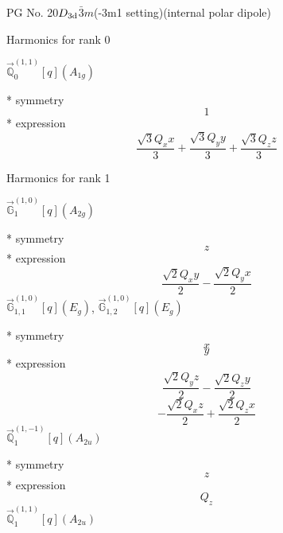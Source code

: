 \documentclass[fleqn,8pt]{jsarticle}
\begin{document}
\setcounter{MaxMatrixCols}{32}

\renewcommand{\tablename}{Table~}
\renewcommand{\figurename}{Figure~}
\begin{center}
\LARGE
PG No. 20\quad$D_{\rm 3d}$\quad$\bar{3}m$\quad(-3m1 setting)\quad[ trigonal ] (internal polar dipole)
\end{center}

\noindent * Harmonics for rank 0

\noindent\quad $\vec{\mathbb{Q}}_{0}^{(1,1)}[q](A_{1g})$

\noindent\quad ** symmetry
\begin{dmath*}
1
\end{dmath*}
\noindent\quad ** expression
\begin{dmath*}
\frac{\sqrt{3} Q_{x} x}{3} + \frac{\sqrt{3} Q_{y} y}{3} + \frac{\sqrt{3} Q_{z} z}{3}
\end{dmath*}

\noindent * Harmonics for rank 1

\noindent\quad $\vec{\mathbb{G}}_{1}^{(1,0)}[q](A_{2g})$

\noindent\quad ** symmetry
\begin{dmath*}
z
\end{dmath*}
\noindent\quad ** expression
\begin{dmath*}
\frac{\sqrt{2} Q_{x} y}{2} - \frac{\sqrt{2} Q_{y} x}{2}
\end{dmath*}
\noindent\quad $\vec{\mathbb{G}}_{1,1}^{(1,0)}[q](E_{g})$, $\vec{\mathbb{G}}_{1,2}^{(1,0)}[q](E_{g})$

\noindent\quad ** symmetry
\begin{dmath*}
x
\end{dmath*}
\begin{dmath*}
y
\end{dmath*}
\noindent\quad ** expression
\begin{dmath*}
\frac{\sqrt{2} Q_{y} z}{2} - \frac{\sqrt{2} Q_{z} y}{2}
\end{dmath*}
\begin{dmath*}
- \frac{\sqrt{2} Q_{x} z}{2} + \frac{\sqrt{2} Q_{z} x}{2}
\end{dmath*}
\noindent\quad $\vec{\mathbb{Q}}_{1}^{(1,-1)}[q](A_{2u})$

\noindent\quad ** symmetry
\begin{dmath*}
z
\end{dmath*}
\noindent\quad ** expression
\begin{dmath*}
Q_{z}
\end{dmath*}
\noindent\quad $\vec{\mathbb{Q}}_{1}^{(1,1)}[q](A_{2u})$
\end{document}
